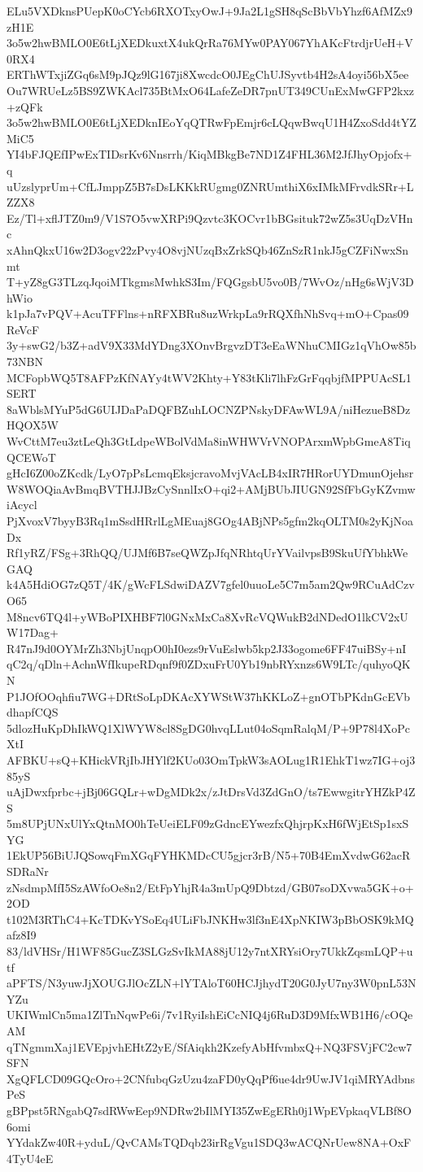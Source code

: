 ELu5VXDknsPUepK0oCYcb6RXOTxyOwJ+9Ja2L1gSH8qScBbVbYhzf6AfMZx9zH1E
3o5w2hwBMLO0E6tLjXEDkuxtX4ukQrRa76MYw0PAY067YhAKcFtrdjrUeH+V0RX4
ERThWTxjiZGq6sM9pJQz9lG167ji8XwcdcO0JEgChUJSyvtb4H2sA4oyi56bX5ee
Ou7WRUeLz5BS9ZWKAcl735BtMxO64LafeZeDR7pnUT349CUnExMwGFP2kxz+zQFk
3o5w2hwBMLO0E6tLjXEDknIEoYqQTRwFpEmjr6cLQqwBwqU1H4ZxoSdd4tYZMiC5
YI4bFJQEfIPwExTIDsrKv6Nnsrrh/KiqMBkgBe7ND1Z4FHL36M2JfJhyOpjofx+q
uUzslyprUm+CfLJmppZ5B7sDsLKKkRUgmg0ZNRUmthiX6xIMkMFrvdkSRr+LZZX8
Ez/Tl+xflJTZ0m9/V1S7O5vwXRPi9Qzvtc3KOCvr1bBGsituk72wZ5s3UqDzVHnc
xAhnQkxU16w2D3ogv22zPvy4O8vjNUzqBxZrkSQb46ZnSzR1nkJ5gCZFiNwxSnmt
T+yZ8gG3TLzqJqoiMTkgmsMwhkS3Im/FQGgsbU5vo0B/7WvOz/nHg6sWjV3DhWio
k1pJa7vPQV+AcuTFFlns+nRFXBRu8uzWrkpLa9rRQXfhNhSvq+mO+Cpas09ReVcF
3y+swG2/b3Z+adV9X33MdYDng3XOnvBrgvzDT3eEaWNhuCMIGz1qVhOw85b73NBN
MCFopbWQ5T8AFPzKfNAYy4tWV2Khty+Y83tKli7lhFzGrFqqbjfMPPUAcSL1SERT
8aWblsMYuP5dG6UIJDaPaDQFBZuhLOCNZPNskyDFAwWL9A/niHezueB8DzHQOX5W
WvCttM7eu3ztLeQh3GtLdpeWBolVdMa8inWHWVrVNOPArxmWpbGmeA8TiqQCEWoT
gHcI6Z00oZKcdk/LyO7pPsLcmqEksjcravoMvjVAcLB4xIR7HRorUYDmunOjehsr
W8WOQiaAvBmqBVTHJJBzCySnnlIxO+qi2+AMjBUbJIUGN92SfFbGyKZvmwiAcycl
PjXvoxV7byyB3Rq1mSsdHRrlLgMEuaj8GOg4ABjNPs5gfm2kqOLTM0s2yKjNoaDx
Rf1yRZ/FSg+3RhQQ/UJMf6B7seQWZpJfqNRhtqUrYVailvpsB9SkuUfYbhkWeGAQ
k4A5HdiOG7zQ5T/4K/gWcFLSdwiDAZV7gfel0uuoLe5C7m5am2Qw9RCuAdCzvO65
M8ncv6TQ4l+yWBoPIXHBF7l0GNxMxCa8XvRcVQWukB2dNDedO1lkCV2xUW17Dag+
R47nJ9d0OYMrZh3NbjUnqpO0hI0ezs9rVuEslwb5kp2J33ogome6FF47uiBSy+nI
qC2q/qDln+AchnWfIkupeRDqnf9f0ZDxuFrU0Yb19nbRYxnzs6W9LTc/quhyoQKN
P1JOfOOqhfiu7WG+DRtSoLpDKAcXYWStW37hKKLoZ+gnOTbPKdnGcEVbdhapfCQS
5dlozHuKpDhIkWQ1XlWYW8cl8SgDG0hvqLLut04oSqmRalqM/P+9P78l4XoPcXtI
AFBKU+sQ+KHickVRjIbJHYlf2KUo03OmTpkW3sAOLug1R1EhkT1wz7IG+oj385yS
uAjDwxfprbc+jBj06GQLr+wDgMDk2x/zJtDrsVd3ZdGnO/ts7EwwgitrYHZkP4ZS
5m8UPjUNxUlYxQtnMO0hTeUeiELF09zGdncEYwezfxQhjrpKxH6fWjEtSp1sxSYG
1EkUP56BiUJQSowqFmXGqFYHKMDcCU5gjcr3rB/N5+70B4EmXvdwG62acRSDRaNr
zNsdmpMfI5SzAWfoOe8n2/EtFpYhjR4a3mUpQ9Dbtzd/GB07soDXvwa5GK+o+2OD
t102M3RThC4+KcTDKvYSoEq4ULiFbJNKHw3lf3nE4XpNKIW3pBbOSK9kMQafz8I9
83/ldVHSr/H1WF85GucZ3SLGzSvIkMA88jU12y7ntXRYsiOry7UkkZqsmLQP+utf
aPFTS/N3yuwJjXOUGJlOcZLN+lYTAloT60HCJjhydT20G0JyU7ny3W0pnL53NYZu
UKIWmlCn5ma1ZlTnNqwPe6i/7v1RyiIshEiCcNIQ4j6RuD3D9MfxWB1H6/cOQeAM
qTNgmmXaj1EVEpjvhEHtZ2yE/SfAiqkh2KzefyAbHfvmbxQ+NQ3FSVjFC2cw7SFN
XgQFLCD09GQcOro+2CNfubqGzUzu4zaFD0yQqPf6ue4dr9UwJV1qiMRYAdbnsPeS
gBPpst5RNgabQ7sdRWwEep9NDRw2bIlMYI35ZwEgERh0j1WpEVpkaqVLBf8O6omi
YYdakZw40R+yduL/QvCAMsTQDqb23irRgVgu1SDQ3wACQNrUew8NA+OxF4TyU4eE
